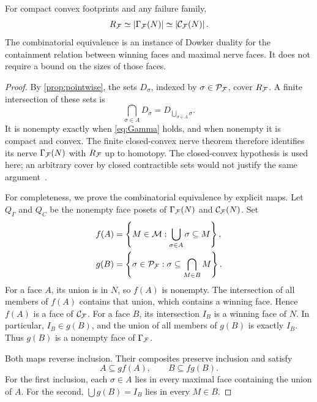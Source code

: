 \begin{theorem}\label{thm:duality}
For compact convex footprints and any failure family,
\begin{equation}\label{eq:homotopy-chain}
R_{\mathcal F}\simeq\left|\Gamma_{\mathcal F}(N)\right|\simeq\left|\mathcal C_{\mathcal F}(N)\right|.
\end{equation}
The combinatorial equivalence is an instance of Dowker duality for the containment relation between winning faces and maximal nerve faces. It does not require a bound on the sizes of those faces.
\end{theorem}
\begin{proof}
By \cref{prop:pointwise}, the sets $D_\sigma$, indexed by $\sigma\in\mathcal P_{\mathcal F}$, cover $R_{\mathcal F}$. A finite intersection of these sets is
\[
\bigcap_{\sigma\in A}D_\sigma=D_{\bigcup_{\sigma\in A}\sigma}.
\]
It is nonempty exactly when \cref{eq:Gamma} holds, and when nonempty it is compact and convex. The finite closed-convex nerve theorem therefore identifies its nerve $\Gamma_{\mathcal F}(N)$ with $R_{\mathcal F}$ up to homotopy. The closed-convex hypothesis is used here; an arbitrary cover by closed contractible sets would not justify the same argument~\cite{bauer}.

For completeness, we prove the combinatorial equivalence by explicit maps. Let $Q_\Gamma$ and $Q_C$ be the nonempty face posets of $\Gamma_{\mathcal F}(N)$ and $\mathcal C_{\mathcal F}(N)$. Set
\begin{align}
f(A)&=\left\{M\in\mathcal M:\bigcup_{\sigma\in A}\sigma\subseteq M\right\},\label{eq:f-map}\\
g(B)&=\left\{\sigma\in\mathcal P_{\mathcal F}:\sigma\subseteq\bigcap_{M\in B}M\right\}.\label{eq:g-map}
\end{align}
For a face $A$, its union is in $N$, so $f(A)$ is nonempty. The intersection of all members of $f(A)$ contains that union, which contains a winning face. Hence $f(A)$ is a face of $\mathcal C_{\mathcal F}$. For a face $B$, its intersection $I_B$ is a winning face of $N$. In particular, $I_B\in g(B)$, and the union of all members of $g(B)$ is exactly $I_B$. Thus $g(B)$ is a nonempty face of $\Gamma_{\mathcal F}$.

Both maps reverse inclusion. Their composites preserve inclusion and satisfy
\begin{equation}\label{eq:closure-inequalities}
A\subseteq g f(A),\qquad B\subseteq f g(B).
\end{equation}
For the first inclusion, each $\sigma\in A$ lies in every maximal face containing the union of $A$. For the second, $\bigcup g(B)=I_B$ lies in every $M\in B$.


\end{proof}
